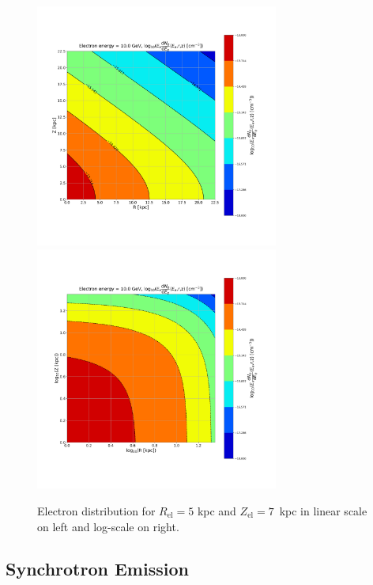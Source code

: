 \documentclass[12pt, a4 paper]{article}
\begin{document}
\begin{figure}[h!]
    \centering
    \includegraphics[width= 8cm]{Images/Linear_EdNdE.png}%
    \includegraphics[width = 8cm]{Images/Log_EdNdE.png}
    \caption{Electron distribution for $R_{\mathrm{el}} = 5$ kpc and $Z_{\mathrm{el}} = 7$~kpc in linear scale on left and log-scale on right.}
    \label{fig:my_label}
\end{figure}

\subsection{Synchrotron Emission}\label{Synchrotron_theory}
\end{document}
